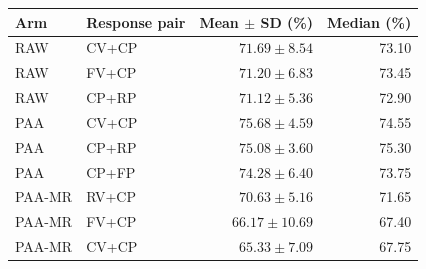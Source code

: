 \begin{tabular}{llrr}
\toprule
Arm & Response pair & Mean $\pm$ SD (\%) & Median (\%) \\
\midrule
RAW & CV+CP & $71.69 \pm 8.54$ & 73.10 \\
RAW & FV+CP & $71.20 \pm 6.83$ & 73.45 \\
RAW & CP+RP & $71.12 \pm 5.36$ & 72.90 \\
PAA & CV+CP & $75.68 \pm 4.59$ & 74.55 \\
PAA & CP+RP & $75.08 \pm 3.60$ & 75.30 \\
PAA & CP+FP & $74.28 \pm 6.40$ & 73.75 \\
PAA-MR & RV+CP & $70.63 \pm 5.16$ & 71.65 \\
PAA-MR & FV+CP & $66.17 \pm 10.69$ & 67.40 \\
PAA-MR & CV+CP & $65.33 \pm 7.09$ & 67.75 \\
\bottomrule
\end{tabular}
